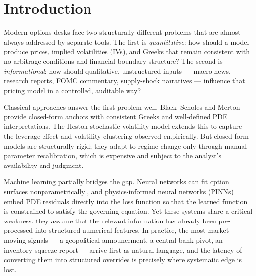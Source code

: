 \documentclass[11pt,a4paper]{article}
\begin{document}
\tableofcontents
\newpage

\section{Introduction}
\label{sec:intro}

Modern options desks face two structurally different problems that are almost always addressed by separate tools. The first is \emph{quantitative}: how should a model produce prices, implied volatilities (IVs), and Greeks that remain consistent with no-arbitrage conditions and financial boundary structure? The second is \emph{informational}: how should qualitative, unstructured inputs — macro news, research reports, FOMC commentary, supply-shock narratives — influence that pricing model in a controlled, auditable way?

Classical approaches answer the first problem well. Black--Scholes \citep{black_scholes_1973} and Merton \citep{merton_1973} provide closed-form anchors with consistent Greeks and well-defined PDE interpretations. The Heston stochastic-volatility model \citep{heston1993closed} extends this to capture the leverage effect and volatility clustering observed empirically. But closed-form models are structurally rigid; they adapt to regime change only through manual parameter recalibration, which is expensive and subject to the analyst's availability and judgment.

Machine learning partially bridges the gap. Neural networks can fit option surfaces nonparametrically \citep{hutchinson_lo_poggio_1994}, and physics-informed neural networks (PINNs) \citep{raissi2019physics} embed PDE residuals directly into the loss function so that the learned function is constrained to satisfy the governing equation. Yet these systems share a critical weakness: they assume that the relevant information has already been pre-processed into structured numerical features. In practice, the most market-moving signals — a geopolitical announcement, a central bank pivot, an inventory squeeze report — arrive first as natural language, and the latency of converting them into structured overrides is precisely where systematic edge is lost.
\end{document}
